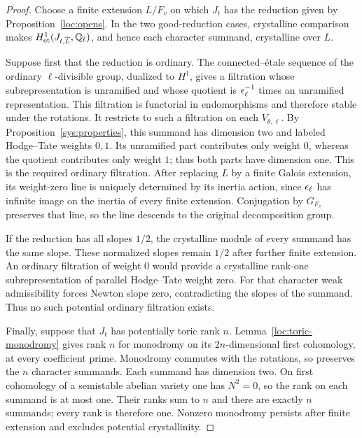 \begin{proof}
Choose a finite extension $L/F_v$ on which $J_t$ has the reduction given
by Proposition~\ref{loc:opens}.  In the two good-reduction cases,
crystalline comparison makes $H^1_{\mathrm{et}}(J_{t,\overline L},\mathbb Q_\ell)$,
and hence each character summand, crystalline over $L$.

Suppose first that the reduction is ordinary.  The connected--\'{e}tale
sequence of the ordinary $\ell$-divisible group, dualized to $H^1$, gives
a filtration whose subrepresentation is unramified and whose quotient
is $\epsilon_\ell^{-1}$ times an unramified representation.  This filtration
is functorial in endomorphisms and therefore stable under the rotations.
It restricts to such a filtration on each $V_{\theta,\ell}$.
By Proposition~\ref{sys:properties}, this summand has dimension two
and labeled Hodge--Tate weights $0,1$.  Its unramified part contributes
only weight $0$, whereas the quotient contributes only weight $1$;
thus both parts have dimension one.  This is the required ordinary
filtration.  After replacing $L$ by a finite Galois extension, its
weight-zero line is uniquely determined by its inertia action, since
$\epsilon_\ell$ has infinite image on the inertia of every finite extension.
Conjugation by $G_{F_v}$ preserves that line, so the line descends to
the original decomposition group.

If the reduction has all slopes $1/2$, the crystalline module of every
summand has the same slope.  These normalized slopes remain $1/2$
after further finite extension.  An ordinary filtration of weight $0$
would provide a crystalline rank-one subrepresentation of parallel
Hodge--Tate weight zero.  For that character weak admissibility forces
Newton slope zero, contradicting the slopes of the summand.  Thus no
such potential ordinary filtration exists.

Finally, suppose that $J_t$ has potentially toric rank $n$.
Lemma~\ref{loc:toric-monodromy} gives rank $n$ for monodromy on its
$2n$-dimensional first cohomology, at every coefficient prime.
Monodromy commutes with the rotations, so preserves the $n$ character
summands.  Each summand has dimension two.  On first cohomology of a
semistable abelian variety one has $N^2=0$, so the rank on each summand
is at most one.  Their ranks sum to $n$ and there are exactly $n$
summands; every rank is therefore one.  Nonzero monodromy persists
after finite extension and excludes potential crystallinity.
\end{proof}
